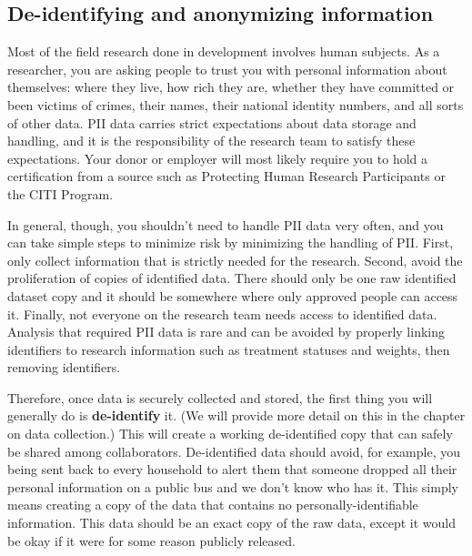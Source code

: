 \subsection{De-identifying and anonymizing information}

Most of the field research done in development involves human subjects.
As a researcher, you are asking people to trust you with personal information about themselves:
where they live, how rich they are, whether they have committed or been victims of crimes,
their names, their national identity numbers, and all sorts of other data.
PII data carries strict expectations about data storage and handling,
and it is the responsibility of the research team to satisfy these expectations.
Your donor or employer will most likely require you to hold a certification from a source
such as Protecting Human Research Participants
or the CITI Program.

In general, though, you shouldn't need to handle PII data very often,
and you can take simple steps to minimize risk by minimizing the handling of PII.
First, only collect information that is strictly needed for the research.
Second, avoid the proliferation of copies of identified data.
There should only be one raw identified dataset copy
and it should be somewhere where only approved people can access it.
Finally, not everyone on the research team needs access to identified data.
Analysis that required PII data is rare
and can be avoided by properly linking identifiers to research information
such as treatment statuses and weights, then removing identifiers.

Therefore, once data is securely collected and stored, the first thing you will generally do is \textbf{de-identify} it.
(We will provide more detail on this in the chapter on data collection.)
This will create a working de-identified copy that can safely be shared among collaborators.
De-identified data should avoid, for example, you being sent back to every household
to alert them that someone dropped all their personal information on a public bus and we don't know who has it.
This simply means creating a copy of the data that contains no personally-identifiable information.
This data should be an exact copy of the raw data,
except it would be okay if it were for some reason publicly released.\cite{matthews2011data}

